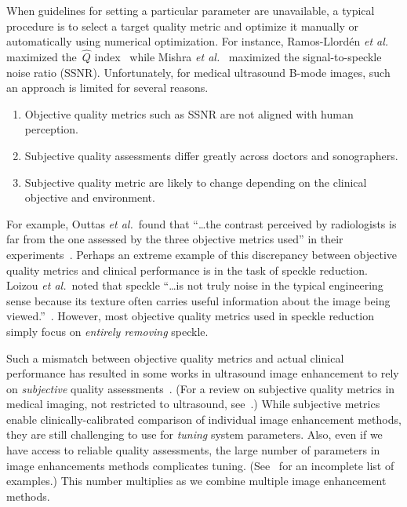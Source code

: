 When guidelines for setting a particular parameter are unavailable, a typical procedure is to select a target quality metric and optimize it manually or automatically using numerical optimization.
For instance, Ramos-Llord\'en \textit{et al.}~\cite{ramos-llorden_anisotropic_2015} maximized the~\(\widehat{Q}\) index~\cite{tay_ultrasound_2006} while Mishra \textit{et al.}~\cite{mishra_edge_2018} maximized the signal-to-speckle noise ratio (SSNR).
Unfortunately, for medical ultrasound B-mode images, such an approach is limited for several reasons.
\vspace{0.05in}
\begin{enumerate}
  \item[\ding{228}] Objective quality metrics such as SSNR are not aligned with human perception.
    \vspace{0.05in}
  \item[\ding{228}] Subjective quality assessments differ greatly across doctors and sonographers.
    \vspace{0.05in}
  \item[\ding{228}] Subjective quality metric are likely to change depending on the clinical objective and environment.
\end{enumerate}
For example, Outtas \textit{et al.}~found that ``\ldots the contrast perceived by radiologists is far from the one assessed by the three objective metrics used'' in their experiments~\cite{outtas_subjective_2018}.
Perhaps an extreme example of this discrepancy between objective quality metrics and clinical performance is in the task of speckle reduction.
Loizou \textit{et al.}~noted that speckle ``\ldots is not truly noise in the typical engineering sense because its texture often carries useful information about the image being viewed.''~\cite{loizou_comparative_2005}.
However, most objective quality metrics used in speckle reduction simply focus on \textit{entirely removing} speckle.

Such a mismatch between objective quality metrics and actual clinical performance has resulted in some works in ultrasound image enhancement to rely on \textit{subjective} quality assessments~\cite{loizou_quality_2006, hemmsen_ultrasound_2010, wong_monte_2012, kang_new_2016, mishra_edge_2018}.
(For a review on subjective quality metrics in medical imaging, not restricted to ultrasound, see~\cite{chow_review_2016}.)
While subjective metrics enable clinically-calibrated comparison of individual image enhancement methods, they are still challenging to use for \textit{tuning} system parameters.
Also, even if we have access to reliable quality assessments, the large number of parameters in image enhancements methods complicates tuning.
(See~\cite[Table 5]{finn_echocardiographic_2011} for an incomplete list of examples.)
This number multiplies as we combine multiple image enhancement methods.

